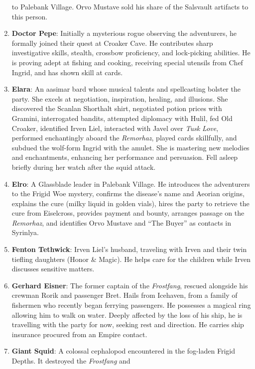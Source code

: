 \documentclass[
  letterpaper,12pt,twoside,twocolumn,openany,
  nodeprecatedcode,bg=full]{dndbook}
\begin{document}
\begin{enumerate}
  to Palebank Village. Orvo Mustave sold his share of the Salsvault
  artifacts to this person.
\item
  \textbf{Doctor Pepe}: Initially a mysterious rogue observing the
  adventurers, he formally joined their quest at Croaker Cave. He
  contributes sharp investigative skills, stealth, crossbow proficiency,
  and lock-picking abilities. He is proving adept at fishing and
  cooking, receiving special utensils from Chef Ingrid, and has shown
  skill at cards.
\item
  \textbf{Elara}: An aasimar bard whose musical talents and spellcasting
  bolster the party. She excels at negotiation, inspiration, healing,
  and illusions. She discovered the Scanlan Shorthalt shirt, negotiated
  potion prices with Gramini, interrogated bandits, attempted diplomacy
  with Hulil, fed Old Croaker, identified Irven Liel, interacted with
  Javel over \emph{Tusk Love}, performed enchantingly aboard the
  \emph{Remorhaz}, played cards skillfully, and subdued the wolf-form
  Ingrid with the amulet. She is mastering new melodies and
  enchantments, enhancing her performance and persuasion. Fell asleep
  briefly during her watch after the squid attack.
\item
  \textbf{Elro}: A Glassblade leader in Palebank Village. He introduces
  the adventurers to the Frigid Woe mystery, confirms the disease's name
  and Aeorian origins, explains the cure (milky liquid in golden vials),
  hires the party to retrieve the cure from Eiselcross, provides payment
  and bounty, arranges passage on the \emph{Remorhaz}, and identifies
  Orvo Mustave and ``The Buyer'' as contacts in Syrinlya.
\item
  \textbf{Fenton Tethwick}: Irven Liel's husband, traveling with Irven
  and their twin tiefling daughters (Honor \& Magic). He helps care for
  the children while Irven discusses sensitive matters.
\item
  \textbf{Gerhard Eisner}: The former captain of the \emph{Frostfang},
  rescued alongside his crewman Rorik and passenger Bret. Hails from
  Icehaven, from a family of fishermen who recently began ferrying
  passengers. He possesses a magical ring allowing him to walk on water.
  Deeply affected by the loss of his ship, he is travelling with the
  party for now, seeking rest and direction. He carries ship insurance
  procured from an Empire contact.
\item
  \textbf{Giant Squid}: A colossal cephalopod encountered in the
  fog-laden Frigid Depths. It destroyed the \emph{Frostfang} and

\end{enumerate}
\end{document}
